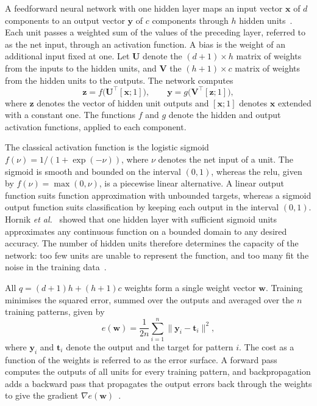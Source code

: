 \documentclass[conference]{IEEEtran}
\newcommand{\vect}[1]{\mathbf{#1}}
\begin{document}
A feedforward neural network with one hidden layer maps an input vector
$\vect{x}$ of $d$ components to an output vector $\vect{y}$ of $c$ components
through $h$ hidden units~\cite{engelbrecht2007}. Each unit passes a weighted sum
of the values of the preceding layer, referred to as the net input, through an
activation function. A bias is the weight of an additional input fixed at one.
Let $\vect{U}$ denote the $(d+1) \times h$ matrix of weights from the inputs to
the hidden units, and $\vect{V}$ the $(h+1) \times c$ matrix of weights from the
hidden units to the outputs. The network computes
\begin{equation}
\vect{z} = f\big(\vect{U}^{\top} [\vect{x}; 1]\big), \qquad
\vect{y} = g\big(\vect{V}^{\top} [\vect{z}; 1]\big),
\end{equation}
where $\vect{z}$ denotes the vector of hidden unit outputs and $[\vect{x}; 1]$
denotes $\vect{x}$ extended with a constant one. The functions $f$ and $g$ denote
the hidden and output activation functions, applied to each component.

The classical activation function is the logistic sigmoid
$f(\nu) = 1/(1 + \exp(-\nu))$, where $\nu$ denotes the net input of a unit. The
sigmoid is smooth and bounded on the interval $(0, 1)$, whereas the \gls{relu},
given by $f(\nu) = \max(0, \nu)$, is a piecewise linear alternative. A linear
output function suits function approximation with unbounded targets, whereas a
sigmoid output function suits classification by keeping each output in the
interval $(0, 1)$. Hornik \emph{et al.}~\cite{hornik1989} showed
that one hidden layer with sufficient sigmoid units approximates any continuous
function on a bounded domain to any desired accuracy. The number of hidden units
therefore determines the capacity of the network: too few units are unable to
represent the function, and too many fit the noise in the training
data~\cite{engelbrecht2007}.

All $q = (d+1)h + (h+1)c$ weights form a single weight vector $\vect{w}$. Training
minimises the squared error, summed over the outputs and averaged over the $n$
training patterns, given by
\begin{equation}
e(\vect{w}) = \frac{1}{2n} \sum_{i=1}^{n} \lVert \vect{y}_i - \vect{t}_i \rVert^2,
\end{equation}
where $\vect{y}_i$ and $\vect{t}_i$ denote the output and the target for pattern
$i$. The cost as a function of the weights is referred to as the error surface. A
forward pass computes the outputs of all units for every training pattern, and
backpropagation adds a backward pass that propagates the output errors back
through the weights to give the gradient
$\nabla e(\vect{w})$~\cite{rumelhart1986}.
\end{document}
